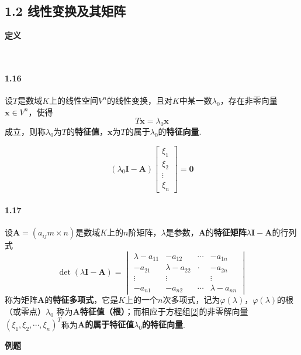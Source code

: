 \documentclass[12pt, a4paper, oneside, fontset=none]{ctexart}
\begin{document}
\subsection*{1.2 \quad 线性变换及其矩阵}

\centerline{\large{\textbf{定义}}} \ \par

\paragraph*{1.16} 设$T$是数域$K$上的线性空间$V^n$的线性变换，且对$K$中某一数$\lambda_0$，存在非零向量
$\bm{x} \in V^n$，使得
\[
    T\bm{x} = \lambda_0 \bm{x} \tag{1.2.18} \label{1}
\]
成立，则称$\lambda_0$为$T$的\textbf{特征值}，$\bm{x}$为$T$的属于$\lambda_0$的\textbf{特征向量}.

\[
    (\lambda_0 \bm{I} - \bm{A})\begin{bmatrix}
        \xi_1  \\
        \xi_2  \\
        \vdots \\
        \xi_n
    \end{bmatrix} = \bm{0} \tag{1.2.20}
\]

\paragraph*{1.17} 设$\bm{A} = (a_{ij}{m\times n})$是数域$K$上的$n$阶矩阵，$\lambda$是参数，$\bm{A}$的\textbf{特征矩阵}$\lambda \bm{I} - \bm{A}$的行列式
\[
    \det(\lambda \bm{I} - \bm{A}) = \begin{vmatrix}
        \lambda - a_{11} & -a_{12}          & \cdots & -a_{1n}          \\
        -a_{21}          & \lambda - a_{22} & \cdot  & -a_{2n}          \\
        \vdots           & \vdots           &        & \vdots           \\
        -a_{n1}          & -a_{n2}          & \cdots & \lambda - a_{nn}
    \end{vmatrix}
    \tag{1.2.22} \label{2}
\]
称为矩阵$\bm{A}$的\textbf{特征多项式}，它是$K$上的一个$n$次多项式，记为$\varphi(\lambda)$，$\varphi(\lambda)$的根（或零点）$\lambda_0$
称为$\bm{A}$\textbf{特征值（根）}；而相应于方程组\eqref{2}的非零解向量$(\xi_1, \xi_2, \cdots , \xi_n)^T$称为$\bm{A}$\textbf{的属于特征值$\lambda_0$的特征向量}.

\centerline{\large{\textbf{例题}}} \ \par
\end{document}
